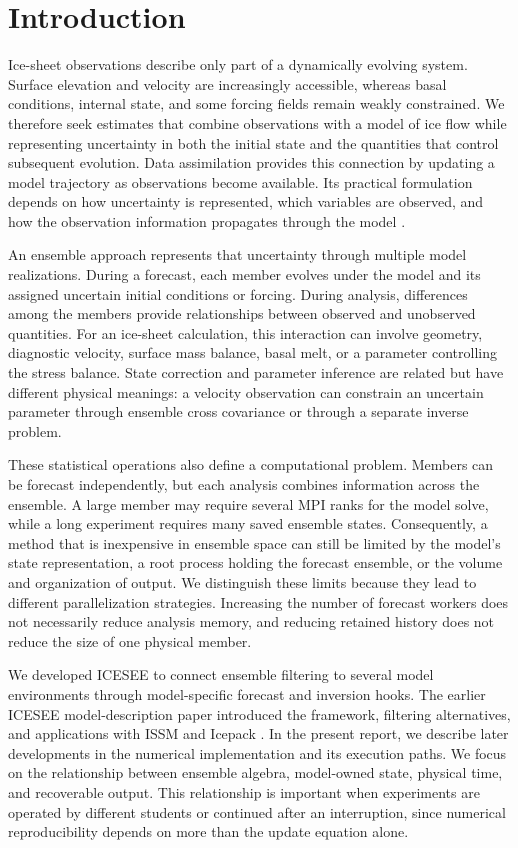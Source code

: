 \documentclass[11pt,a4paper]{article}
\begin{document}
\section{Introduction}
Ice-sheet observations describe only part of a dynamically evolving system. Surface elevation and velocity are increasingly accessible, whereas basal conditions, internal state, and some forcing fields remain weakly constrained. We therefore seek estimates that combine observations with a model of ice flow while representing uncertainty in both the initial state and the quantities that control subsequent evolution. Data assimilation provides this connection by updating a model trajectory as observations become available. Its practical formulation depends on how uncertainty is represented, which variables are observed, and how the observation information propagates through the model \citep{carrassi2018}.

An ensemble approach represents that uncertainty through multiple model realizations. During a forecast, each member evolves under the model and its assigned uncertain initial conditions or forcing. During analysis, differences among the members provide relationships between observed and unobserved quantities. For an ice-sheet calculation, this interaction can involve geometry, diagnostic velocity, surface mass balance, basal melt, or a parameter controlling the stress balance. State correction and parameter inference are related but have different physical meanings: a velocity observation can constrain an uncertain parameter through ensemble cross covariance or through a separate inverse problem.

These statistical operations also define a computational problem. Members can be forecast independently, but each analysis combines information across the ensemble. A large member may require several MPI ranks for the model solve, while a long experiment requires many saved ensemble states. Consequently, a method that is inexpensive in ensemble space can still be limited by the model's state representation, a root process holding the forecast ensemble, or the volume and organization of output. We distinguish these limits because they lead to different parallelization strategies. Increasing the number of forecast workers does not necessarily reduce analysis memory, and reducing retained history does not reduce the size of one physical member.

We developed ICESEE to connect ensemble filtering to several model environments through model-specific forecast and inversion hooks. The earlier ICESEE model-description paper introduced the framework, filtering alternatives, and applications with ISSM and Icepack \citep{kyanjo2026}. In the present report, we describe later developments in the numerical implementation and its execution paths. We focus on the relationship between ensemble algebra, model-owned state, physical time, and recoverable output. This relationship is important when experiments are operated by different students or continued after an interruption, since numerical reproducibility depends on more than the update equation alone.
\end{document}
